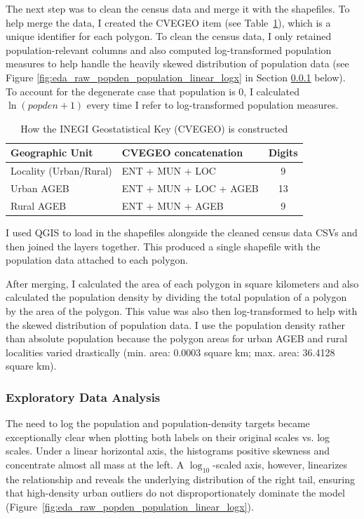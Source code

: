 \documentclass[12pt,letterpaper]{article}
\begin{document}
The next step was to clean the census data and merge it with the shapefiles. To help merge the data, I created the CVEGEO item (see Table~\ref{tab:cvegeo_structure}), which is a unique identifier for each polygon. To clean the census data, I only retained population-relevant columns and also computed log-transformed population measures to help handle the heavily skewed distribution of population data (see Figure \ref{fig:eda_raw_popden_population_linear_logx} in Section \ref{subsub:eda} below). To account for the degenerate case that population is 0, I calculated $\ln{(popden + 1)}$ every time I refer to log-transformed population measures.

\begin{table}[H]
  \centering
  \caption{How the INEGI Geostatistical Key (CVEGEO) is constructed}
  \label{tab:cvegeo_structure}
  \renewcommand{\arraystretch}{1.15}
  \setlength{\tabcolsep}{8pt}
  \begin{tabularx}{\linewidth}{@{} l l c @{}}
    \toprule
    \textbf{Geographic Unit} & \textbf{CVEGEO concatenation} & \textbf{Digits} \\
    \midrule
    Locality (Urban/Rural) & ENT + MUN + LOC & 9 \\
    Urban AGEB & ENT + MUN + LOC + AGEB & 13 \\
    Rural AGEB & ENT + MUN + AGEB & 9 \\
    \bottomrule
  \end{tabularx}
\end{table}

I used QGIS to load in the shapefiles alongside the cleaned census data CSVs and then joined the layers together. This produced a single shapefile with the population data attached to each polygon.

After merging, I calculated the area of each polygon in square kilometers and also calculated the population density by dividing the total population of a polygon by the area of the polygon. This value was also then log-transformed to help with the skewed distribution of population data. I use the population density rather than absolute population because the polygon areas for urban AGEB and rural localities varied drastically (min. area: 0.0003 square km; max. area: 36.4128 square km).

\subsubsection{Exploratory Data Analysis}
\label{subsub:eda}
The need to log the population and population-density targets became exceptionally clear when plotting both labels on their original scales vs. log scales. Under a linear horizontal axis, the histograms positive skewness and concentrate almost all mass at the left. A $\log_{10}$-scaled axis, however, linearizes the relationship and reveals the underlying distribution of the right tail, ensuring that high-density urban outliers do not disproportionately dominate the model (Figure~\ref{fig:eda_raw_popden_population_linear_logx}).
\end{document}
